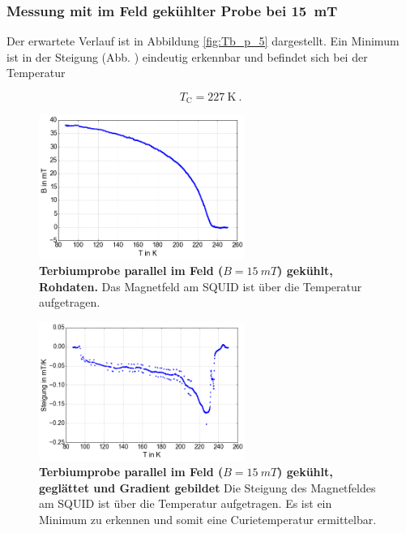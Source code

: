 \documentclass[a4paper,ngerman]{scrartcl}
\begin{document}
\subsubsection*{Messung mit im Feld gekühlter Probe bei \SI{15}{mT}}

Der erwartete Verlauf ist in Abbildung \ref{fig:Tb_p_5} dargestellt.
Ein Minimum ist in der Steigung (Abb. ) eindeutig erkennbar und befindet sich bei der Temperatur

\begin{equation}
T_{\mathrm{C}} = \SI{227}{\K} ~.
\end{equation}

\begin{figure}
\centering
\includegraphics[width=0.6\textwidth]{abbildungen/Tb_p_15.png}
\caption[Terbiumprobe parallel bei 15mT]{\textbf{Terbiumprobe parallel im Feld ($B = \SI{15}{mT}$) gekühlt, Rohdaten.} 
Das Magnetfeld am SQUID ist über die Temperatur aufgetragen. }
\label{fig:Tb_p_15}
\end{figure}

\begin{figure}
\centering
\includegraphics[width=0.6\textwidth]{abbildungen/Tb_p_15_grad.png}
\caption[Terbiumprobe parallel bei 15mT]{\textbf{Terbiumprobe parallel im Feld ($B = \SI{15}{mT}$) gekühlt, geglättet und Gradient gebildet} 
Die Steigung des Magnetfeldes am SQUID ist über die Temperatur aufgetragen. 
Es ist ein Minimum zu erkennen und somit eine Curietemperatur ermittelbar.}
\label{fig:Tb_p_15_grad}
\end{figure}
\end{document}
